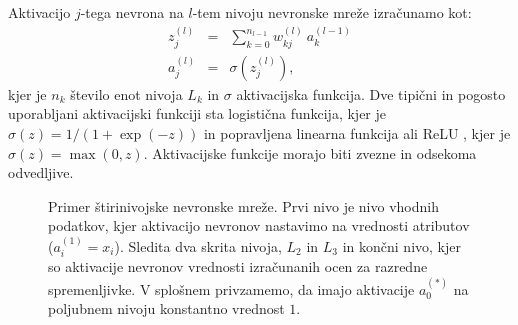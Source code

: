 Aktivacijo $j$-tega nevrona na $l$-tem nivoju nevronske mreže izračunamo kot:
\begin{eqnarray}
z_j^{(l)} & = & \sum_{k=0}^{n_{l-1}} w_{kj}^{(l)}\ a_k^{(l-1)} \\
a_j^{(l)} & = & \sigma(z_j^{(l)}),
\end{eqnarray}
kjer je $n_k$ število enot nivoja $L_k$ in $\sigma$ aktivacijska funkcija. Dve tipični in pogosto uporabljani aktivacijski funkciji sta logistična funkcija, kjer je $\sigma(z)=1/(1+\exp(-z))$ in popravljena linearna funkcija ali ReLU , kjer je $\sigma(z)=\max(0, z)$. Aktivacijske funkcije morajo biti zvezne in odsekoma odvedljive.


\begin{figure}[htbp]
\caption{Primer štirinivojske nevronske mreže. Prvi nivo je nivo vhodnih podatkov, kjer aktivacijo nevronov nastavimo na vrednosti atributov ($a_i^{(1)}=x_i$). Sledita dva skrita nivoja, $L_2$ in $L_3$ in končni nivo, kjer so aktivacije nevronov vrednosti izračunanih ocen za razredne spremenljivke. V splošnem privzamemo, da imajo aktivacije $a_0^{(*)}$ na poljubnem nivoju konstantno vrednost $1$.}
\label{f-primer-mreze}
\end{figure}

